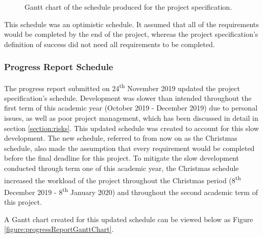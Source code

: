 \documentclass{article}
\begin{document}
\begin{figure}[H]
	\centering
	\caption{Gantt chart of the schedule produced for the project specification.}
	\label{figure:projectSpecGanttChart}
\end{figure}

This schedule was an optimistic schedule. It assumed that all of the requirements would be completed by the end of the project, whereas the project specification's definition of success did not need all requirements to be completed. 

\subsubsection{Progress Report Schedule}

The progress report submitted on 24\textsuperscript{th} November 2019 updated the project specification's schedule. Development was slower than intended throughout the first term of this academic year (October 2019 - December 2019) due to personal issues, as well as poor project management, which has been discussed in detail in section \ref{section:risks}. This updated schedule was created to account for this slow development. The new schedule, referred to from now on as the Christmas schedule, also made the assumption that every requirement would be completed before the final deadline for this project. To mitigate the slow development conducted through term one of this academic year, the Christmas schedule increased the workload of the project throughout the Christmas period (8\textsuperscript{th} December 2019 - 8\textsuperscript{th} January 2020) and throughout the second academic term of this project. \par

A Gantt chart created for this updated schedule can be viewed below as Figure \ref{figure:progressReportGanttChart}. \par
\end{document}
